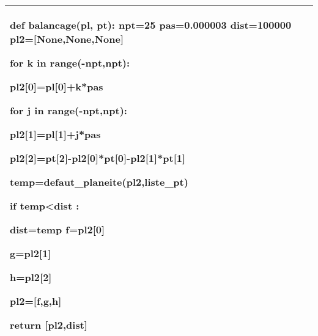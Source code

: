 \documentclass[10pt,fleqn]{article} %
\begin{document}
\subparagraph{} 
\begin{center}
\begin{tabular}{|p{.95\linewidth}|}
\hline

\vspace{1cm}
\dotfill

\vspace{1cm}
\dotfill

\vspace{1cm}
\dotfill

\begin{python}
def balancage(pl, pt):
    npt=25
    pas=0.000003 
    dist=100000  
    pl2=[None,None,None]
  
    for k in range(-npt,npt):
    
        pl2[0]=pl[0]+k*pas
        
        for j in range(-npt,npt):
        
            pl2[1]=pl[1]+j*pas
            
            pl2[2]=pt[2]-pl2[0]*pt[0]-pl2[1]*pt[1]
            
            temp=defaut_planeite(pl2,liste_pt)	
            
            if temp<dist :
            
                dist=temp
                f=pl2[0]
                
                g=pl2[1]
                
                h=pl2[2]
                
    pl2=[f,g,h]    
    
    return [pl2,dist]	  
\end{python}
 \\
\hline
\end{tabular}
\end{center}

\newpage 

\subparagraph{} 
\begin{center}
\begin{tabular}{|p{.95\linewidth}|}
\hline
\vspace{1cm}
\dotfill

\vspace{1cm}
\dotfill

\vspace{1cm}
\dotfill

\vspace{1cm}
\dotfill

\vspace{1cm}
\dotfill

\vspace{0.5cm}
 \\
\hline
\end{tabular}
\end{center}
\end{document}
